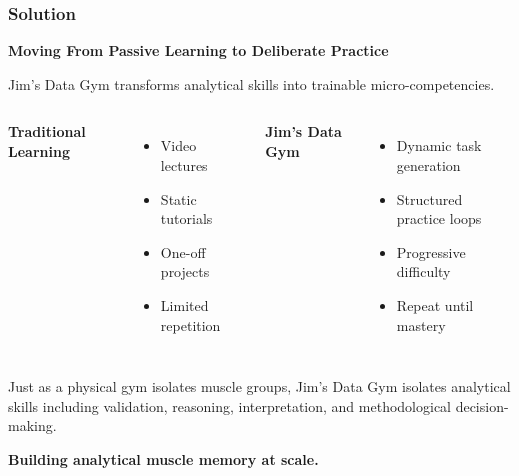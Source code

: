 \documentclass[aspectratio=169]{beamer}
\begin{document}
\begin{frame}
\frametitle{\textcolor{AccentGreen}{Solution}}

\Large \textbf{Moving From Passive Learning to Deliberate Practice}

\vspace{0.3cm}

Jim's Data Gym transforms analytical skills into trainable micro-competencies.

\begin{columns}
\textbf{Traditional Learning}
\begin{itemize}
\item Video lectures
\item Static tutorials
\item One-off projects
\item Limited repetition
\end{itemize}

\textbf{Jim's Data Gym}
\begin{itemize}
\item Dynamic task generation
\item Structured practice loops
\item Progressive difficulty
\item Repeat until mastery
\end{itemize}
\end{columns}

\vspace{0.4cm}

Just as a physical gym isolates muscle groups, Jim's Data Gym isolates analytical skills including validation, reasoning, interpretation, and methodological decision-making.

\textcolor{AccentGreen}{\textbf{Building analytical muscle memory at scale.}}
\end{frame}
\end{document}
